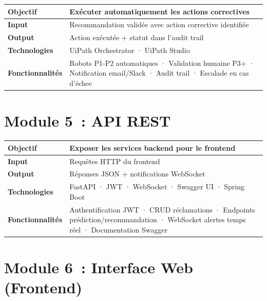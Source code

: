 \documentclass[12pt,a4paper]{report}
\begin{document}
\begin{table}[H]
\centering
\begin{tabularx}{\textwidth}{|l|X|}
\hline
\textbf{Objectif} & Exécuter automatiquement les actions correctives \\
\hline
\textbf{Input} & Recommandation validée avec action corrective identifiée \\
\hline
\textbf{Output} & Action exécutée + statut dans l'audit trail \\
\hline
\textbf{Technologies} & UiPath Orchestrator · UiPath Studio \\
\hline
\textbf{Fonctionnalités} & Robots P1-P2 automatiques · Validation humaine P3+ · Notification email/Slack · Audit trail · Escalade en cas d'échec \\
\hline
\end{tabularx}
\end{table}

\section{Module 5~: API REST}

\begin{table}[H]
\centering
\begin{tabularx}{\textwidth}{|l|X|}
\hline
\textbf{Objectif} & Exposer les services backend pour le frontend \\
\hline
\textbf{Input} & Requêtes HTTP du frontend \\
\hline
\textbf{Output} & Réponses JSON + notifications WebSocket \\
\hline
\textbf{Technologies} & FastAPI · JWT · WebSocket · Swagger UI · Spring Boot \\
\hline
\textbf{Fonctionnalités} & Authentification JWT · CRUD réclamations · Endpoints prédiction/recommandation · WebSocket alertes temps réel · Documentation Swagger \\
\hline
\end{tabularx}
\end{table}

\section{Module 6~: Interface Web (Frontend)}
\end{document}
